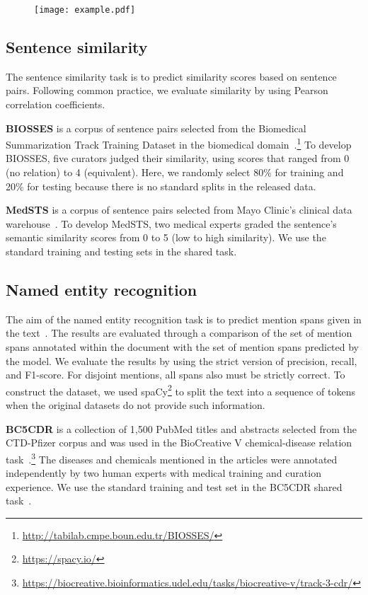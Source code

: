 \documentclass[11pt,a4paper]{article}
\begin{document}
\begin{figure}[t]
\centering
\texttt{[image: example.pdf]}
\label{fig:example}
\vspace{-5ex}
\end{figure}


\subsection{Sentence similarity}

The sentence similarity task is to predict similarity scores based on sentence pairs. Following common practice, we evaluate similarity by using Pearson correlation coefficients.

\textbf{BIOSSES} is a corpus of sentence pairs selected from the Biomedical Summarization Track Training Dataset in the biomedical domain~\cite{sogancioglu2017biosses}.\footnote{\url{http://tabilab.cmpe.boun.edu.tr/BIOSSES/}} To develop BIOSSES, five curators judged their similarity, using scores that ranged from 0 (no relation) to 4 (equivalent). Here, we randomly select 80\% for training and 20\% for testing because there is no standard splits in the released data.

\textbf{MedSTS} is a corpus of sentence pairs selected from Mayo Clinic’s clinical data warehouse~\cite{wang2018medstsa}. To develop MedSTS, two medical experts graded the sentence's semantic similarity scores from 0 to 5 (low to high similarity). We use the standard training and testing sets in the shared task.

\subsection{Named entity recognition}

The aim of the named entity recognition task is to predict mention spans given in the text~\cite{jurafsky2008speech}. The results are evaluated through a comparison of the set of mention spans annotated within the document with the set of mention spans predicted by the model. We evaluate the results by using the strict version of precision, recall, and F1-score. For disjoint mentions, all spans also must be strictly correct. To construct the dataset, we used spaCy\footnote{\url{https://spacy.io/}} to split the text into a sequence of tokens when the original datasets do not provide such information.

\textbf{BC5CDR} is a collection of 1,500 PubMed titles and abstracts selected from the CTD-Pfizer corpus and was used in the BioCreative V chemical-disease relation task~\cite{li2016biocreative}.\footnote{\url{https://biocreative.bioinformatics.udel.edu/tasks/biocreative-v/track-3-cdr/}} The diseases and chemicals mentioned in the articles were annotated independently by two human experts with medical training and curation experience. We use the standard training and test set in the BC5CDR shared task~\cite{wei2016assessing}.
\end{document}
